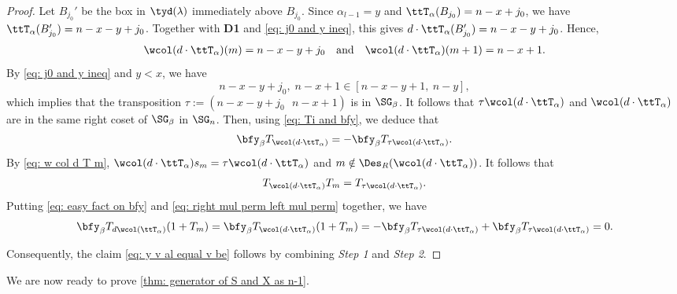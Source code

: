 \documentclass[12pt, reqno]{amsart}
\theoremstyle{plain}
\theoremstyle{definition}
\numberwithin{equation}{section}
\numberwithin{figure}{section}
\numberwithin{table}{section}
\begin{document}
\begin{proof}
Let $B_{j_0}'$ be the box in $\tyd(\lambda)$ immediately above
$B_{j_0}$.
Since $\alpha_{l-1} = y$ and $\ttT_{\alpha}(B_{j_0}) = n - x + j_0$, we have $\ttT_{\alpha}(B_{j_0}') = n - x - y + j_0$. 
Together with \textbf{D1} and \cref{eq: j0 and y ineq}, this gives $d \cdot \ttT_{\alpha}(B'_{j_0}) = n- x- y +j_0$.
Hence,
\begin{align}\label{eq: w col d T m}
\wcol(d \cdot \ttT_{\alpha})(m)
= n-x-y+j_0
\quad \text{and} \quad
\wcol(d \cdot \ttT_{\alpha})(m+1)
= n-x+1.
\end{align}
By \cref{eq: j0 and y ineq} and $y < x$, we have 
\[
n-x-y+j_0,\;  n-x+1 \in [n-x-y+1, \ n-y],
\]
which implies that the transposition $\tau := (n-x-y+j_0 \ \ \  n-x+1)$ is in $\SG_\beta$.
It follows that  $\tau \wcol(d \cdot \ttT_{\alpha})$ and $\wcol(d \cdot \ttT_{\alpha})$ are in the same right coset of $\SG_{\beta}$ in $\SG_n$. 
Then, using \cref{eq: Ti and bfy}, we deduce that
\begin{align}\label{eq: easy fact on bfy}
\bfy_{\beta} T_{\wcol(d \cdot \ttT_{\alpha})} = - \bfy_{\beta} T_{\tau \wcol(d \cdot \ttT_{\alpha})}. 
\end{align}
By \cref{eq: w col d T m}, $\wcol(d \cdot \ttT_{\alpha})s_m = \tau \wcol(d \cdot \ttT_{\alpha})$ and $m \notin \Des_R(\wcol(d \cdot \ttT_{\alpha}))$.
It follows that 
\begin{align}\label{eq: right mul perm left mul perm}
T_{\wcol(d \cdot \ttT_{\alpha})} T_m = 
T_{\tau \wcol(d \cdot \ttT_{\alpha})}.
\end{align}
Putting \cref{eq: easy fact on bfy} and \cref{eq: right mul perm left mul perm} together, we have
\begin{align*}
\bfy_{\beta} T_{ d \wcol(\ttT_\alpha)} (1+T_m) 
= \bfy_{\beta} T_{ \wcol(d \cdot \ttT_\alpha)} (1+T_m) 
= - \bfy_{\beta} T_{\tau \wcol(d \cdot \ttT_\alpha)} + \bfy_{\beta}T_{\tau \wcol(d \cdot \ttT_{\alpha})}
= 0.
\end{align*}

Consequently, the claim \cref{eq: y v al equal v be}
follows by combining 
{\it Step 1} and {\it Step 2}.
\end{proof}


We are now ready to prove \protect\cref{thm: generator of S and X as n-1}.
\end{document}

